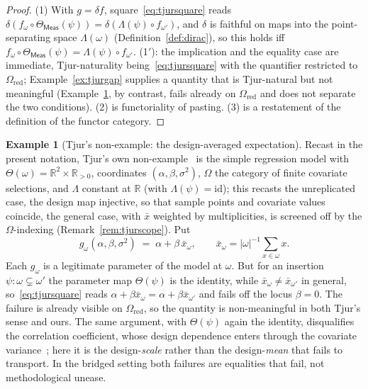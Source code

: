 \documentclass[11pt,a4paper]{article}
\theoremstyle{plain}
\theoremstyle{definition}
\newtheorem{example}[theorem]{Example}
\theoremstyle{remark}
\newcommand{\cat}[1]{\mathsf{#1}}
\newcommand{\catO}{\cat{\Omega}}
\newcommand{\Meas}{\cat{Meas}}
\newcommand{\id}{\mathrm{id}}
\newcommand{\del}{\delta}
\newcommand{\R}{\mathbb{R}}
\begin{document}
\begin{proof}
(1) With $g = \del f$, square~\eqref{eq:tjursquare} reads
$\del(f_\omega \circ \Theta_\Meas(\psi)) = \del(\Lambda(\psi) \circ
f_{\omega'})$, and $\del$ is faithful on maps into the point-separating
space $\Lambda(\omega)$ (Definition~\ref{def:dirac}), so this holds iff
$f_\omega \circ \Theta_\Meas(\psi) = \Lambda(\psi) \circ f_{\omega'}$.
(1$'$): the implication and the equality case are immediate, Tjur-naturality
being~\eqref{eq:tjursquare} with the quantifier restricted to
$\catO_{\mathrm{red}}$; Example~\ref{ex:tjurgap} supplies a quantity that is
Tjur-natural but not meaningful (Example~\ref{ex:alphabetaxbar}, by contrast,
fails already on $\catO_{\mathrm{red}}$ and does not separate the two
conditions). (2) is
functoriality of pasting. (3) is a restatement of the definition of the
functor category.
\end{proof}

\begin{example}[Tjur's non-example: the design-averaged
expectation]\label{ex:alphabetaxbar}
Recast in the present notation, Tjur's own
non-example~\cite[pp.~1299--1300]{tjur_discussion_2002} is the simple regression
model with $\Theta(\omega) = \R^2 \times \R_{>0}$, coordinates
$(\alpha,\beta,\sigma^2)$, $\catO$ the category of finite covariate
selections, and $\Lambda$ constant at $\R$ (with $\Lambda(\psi) = \id$);
this recasts the unreplicated case, the design map injective, so that
sample points and covariate values coincide, the general case, with
$\bar x$ weighted by multiplicities, is screened off by the
$\catO$-indexing (Remark~\ref{rem:tjurscope}). Put
\[
g_{\omega}(\alpha,\beta,\sigma^2) \;=\; \alpha + \beta\,\bar x_{\omega},
\qquad
\bar x_{\omega} = |\omega|^{-1}\textstyle\sum_{x \in \omega} x .
\]
Each $g_\omega$ is a legitimate parameter of the model at $\omega$. But for
an insertion $\psi \colon \omega \subsetneq \omega'$ the parameter map
$\Theta(\psi)$ is the identity, while $\bar x_\omega \neq \bar x_{\omega'}$ in
general, so~\eqref{eq:tjursquare} reads $\alpha + \beta\bar x_{\omega} = \alpha
+ \beta\bar x_{\omega'}$ and fails off the locus $\beta = 0$. The failure is
already visible on $\catO_{\mathrm{red}}$, so the quantity is non-meaningful in
both Tjur's sense and ours. The same argument, with $\Theta(\psi)$ again the
identity, disqualifies the correlation coefficient, whose design dependence
enters through the covariate
variance~\cite[\S6.2]{mccullagh_what_2002}; here it is
the design-\emph{scale} rather than the design-\emph{mean} that fails to
transport. In the bridged setting both failures are equalities that fail,
not methodological unease.
\end{example}
\end{document}
